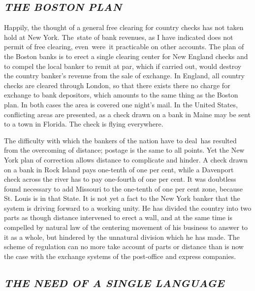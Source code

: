 \documentclass[twoside,symmetric,nobib,justified]{tufte-book}
\begin{document}
\hypertarget{the-boston-plan}{%
\subsection{\texorpdfstring{\emph{THE BOSTON
PLAN}}{THE BOSTON PLAN}}\label{the-boston-plan}}

Happily, the thought of a general free clearing for country checks has
not taken hold at New York. The~state of bank revenues, as I have
indicated does not permit of free clearing, even~were~it practicable on
other accounts. The plan of the Boston banks is to erect a single
clearing center for New England checks and to compel the local banker to
remit at par, which if carried out, would destroy the country banker's
revenue from the sale of exchange. In England, all country checks are
cleared through London, so that there exists there no charge for
exchange to bank depositors, which amounts to the same thing as the
Boston plan. In both cases the area is covered one night's mail. In the
United States, conflicting areas are presented, as a check drawn on a
bank in Maine may be sent to a town in Florida. The check is flying
everywhere.

\enlargethispage{\baselineskip}

The difficulty with which the bankers of the nation have to deal~has
resulted from the overcoming of distance; postage is the same to all
points. Yet the New York plan of correction allows distance to
complicate and hinder. A check drawn on a bank in Rock Island pays
one-tenth of one per cent, while a Davenport check across the river has
to pay one-fourth of one per cent. It was doubtless found necessary to
add Missouri to the one-tenth of one per cent zone, because St. Louis is
in that State. It is not yet a fact to the New York banker that the
system is driving forward to a working unity. He has divided the country
into two parts as though distance intervened to erect a wall, and at the
same time is compelled by natural law of the centering movement of his
business to answer to it as a whole, but hindered by the unnatural
division which he has made. The scheme of regulation can no more take
account of parts or distance than is now the case with the exchange
systems of the post-office and express companies.~

\hypertarget{the-need-of-a-single-language}{%
\subsection{\texorpdfstring{\emph{THE NEED OF A SINGLE
LANGUAGE}}{THE NEED OF A SINGLE LANGUAGE}}\label{the-need-of-a-single-language}}
\end{document}
